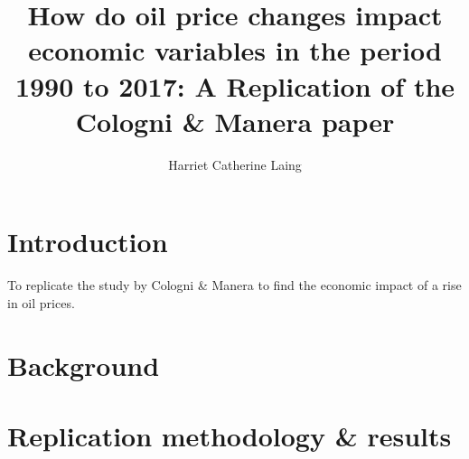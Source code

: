 \documentclass[11pt,preprint, authoryear]{elsarticle}
\numberwithin{equation}{section}
\numberwithin{figure}{section}
\numberwithin{table}{section}
\begin{document}
\begin{frontmatter}  %

\title{How do oil price changes impact economic variables in the period
1990 to 2017: A Replication of the Cologni \& Manera paper}





\author[Add1]{Harriet Catherine Laing}





\address[Add1]{Stellenbosch University, Stellenbosch, South Africa}



\vspace{1cm}





\vspace{0.5cm}

\end{frontmatter}



\pagestyle{fancy}
\chead{}
\rhead{}
\lfoot{}
\lhead{}
\cfoot{}


\headsep 35pt %




\hypertarget{introduction}{%
\section{\texorpdfstring{Introduction
\label{Introduction}}{Introduction }}\label{introduction}}

To replicate the study by Cologni \& Manera to find the economic impact
of a rise in oil prices.

\hypertarget{background}{%
\section{Background}\label{background}}

\hypertarget{replication-methodology-results}{%
\section{Replication methodology \&
results}\label{replication-methodology-results}}
\end{document}
